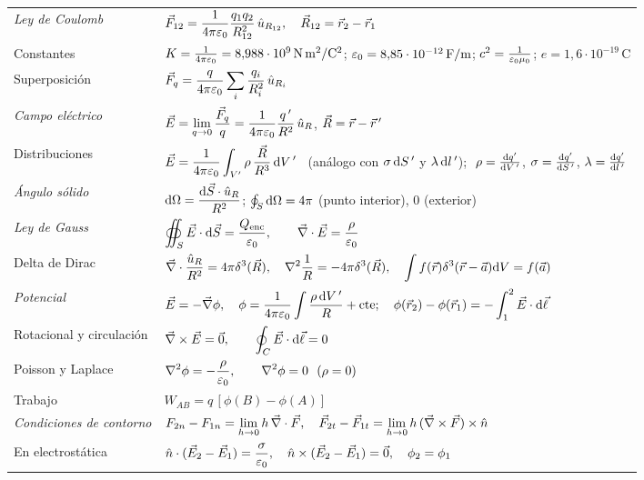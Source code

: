 \begin{center}
\label{tab:formulario}
\small
\renewcommand{\arraystretch}{1.7}
\begin{tabular}{@{}p{4.2cm}p{10.2cm}@{}}
\toprule
\emph{Ley de Coulomb} & $\displaystyle\vec{F}_{12}=\frac{1}{4\pi\varepsilon_{0}}\frac{q_1q_2}{R_{12}^{2}}\,\hat{u}_{R_{12}},\quad\vec{R}_{12}=\vec{r}_2-\vec{r}_1$\\
Constantes & $K=\frac{1}{4\pi\varepsilon_{0}}=8{,}988\cdot10^{9}\,\mathrm{N\,m^{2}/C^{2}}$; $\varepsilon_{0}=8{,}85\cdot10^{-12}\,\mathrm{F/m}$; $c^{2}=\frac{1}{\varepsilon_{0}\mu_0}$; $e=1{,}6\cdot10^{-19}\,\mathrm{C}$\\
Superposición & $\displaystyle\vec{F}_q=\frac{q}{4\pi\varepsilon_{0}}\sum_i\frac{q_i}{R_i^{2}}\,\hat{u}_{R_i}$\\
\midrule
\emph{Campo eléctrico} & $\displaystyle\vec{E}=\lim_{q\to0}\frac{\vec{F}_q}{q}=\frac{1}{4\pi\varepsilon_{0}}\frac{q\,'}{R^{2}}\,\hat{u}_{R}$, \quad $\vec{R}=\vec{r}-\vec{r}\,'$\\
Distribuciones & $\displaystyle\vec{E}=\frac{1}{4\pi\varepsilon_{0}}\int_{V'}\rho\,\frac{\vec{R}}{R^{3}}\,\mathrm{d} V\,'$ \ (análogo con $\sigma\,\mathrm{d} S\,'$ y $\lambda\,\mathrm{d} l\,'$); $\ \rho=\frac{\mathrm{d} q'}{\mathrm{d} V\,'}$, $\sigma=\frac{\mathrm{d} q'}{\mathrm{d} S\,'}$, $\lambda=\frac{\mathrm{d} q'}{\mathrm{d} l\,'}$\\
\midrule
\emph{Ángulo sólido} & $\displaystyle\mathrm{d}\Omega=\frac{\mathrm{d}\vec{S}\cdot\hat{u}_{R}}{R^{2}}$; \quad $\oint_S\mathrm{d}\Omega=4\pi$ (punto interior), $0$ (exterior)\\
\emph{Ley de Gauss} & $\displaystyle\oiint_{S}\vec{E}\cdot\mathrm{d}\vec{S}=\frac{Q_{\mathrm{enc}}}{\varepsilon_{0}},\qquad\vec{\nabla}\cdot\vec{E}=\frac{\rho}{\varepsilon_{0}}$\\
Delta de Dirac & $\displaystyle\vec{\nabla}\cdot\frac{\hat{u}_{R}}{R^{2}}=4\pi\delta^{3}(\vec{R}),\quad\nabla^{2}\frac{1}{R}=-4\pi\delta^{3}(\vec{R}),\quad\int f(\vec{r})\delta^{3}(\vec{r}-\vec{a})\mathrm{d} V=f(\vec{a})$\\
\midrule
\emph{Potencial} & $\displaystyle\vec{E}=-\vec{\nabla}\phi,\quad\phi=\frac{1}{4\pi\varepsilon_{0}}\int\frac{\rho\,\mathrm{d} V\,'}{R}+\text{cte};\quad\phi(\vec{r}_2)-\phi(\vec{r}_1)=-\int_{1}^{2}\vec{E}\cdot\mathrm{d}\vec{\ell}$\\
Rotacional y circulación & $\displaystyle\vec{\nabla}\times\vec{E}=\vec{0},\qquad\oint_C\vec{E}\cdot\mathrm{d}\vec{\ell}=0$\\
Poisson y Laplace & $\displaystyle\Lap\phi=-\frac{\rho}{\eo},\qquad\Lap\phi=0\ \ (\rho=0)$\\
Trabajo & $W_{AB}=q\,[\phi(B)-\phi(A)]$\\
\midrule
\emph{Condiciones de contorno} & $\displaystyle F_{2n}-F_{1n}=\lim_{h\to0}h\,\vec{\nabla}\cdot\vec{F},\quad\vec{F}_{2t}-\vec{F}_{1t}=\lim_{h\to0}h\,(\vec{\nabla}\times\vec{F})\times\hat{n}$\\
En electrostática & $\displaystyle\hat{n}\cdot(\vec{E}_2-\vec{E}_1)=\frac{\sigma}{\varepsilon_{0}},\quad\hat{n}\times(\vec{E}_2-\vec{E}_1)=\vec{0},\quad\phi_2=\phi_1$\\
\bottomrule
\end{tabular}
\end{center}
